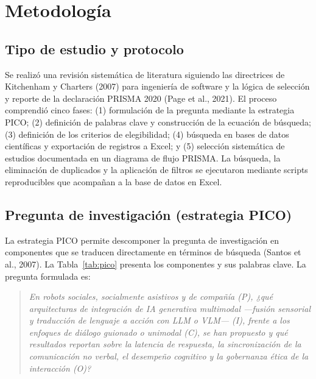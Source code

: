 \documentclass[runningheads]{llncs}
\begin{document}
\section{Metodología}
\subsection{Tipo de estudio y protocolo}
Se realizó una revisión sistemática de literatura siguiendo las directrices de Kitchenham y Charters (2007) para ingeniería de software y la lógica de selección y reporte de la declaración PRISMA 2020 (Page et al., 2021). El proceso comprendió cinco fases: (1) formulación de la pregunta mediante la estrategia PICO; (2) definición de palabras clave y construcción de la ecuación de búsqueda; (3) definición de los criterios de elegibilidad; (4) búsqueda en bases de datos científicas y exportación de registros a Excel; y (5) selección sistemática de estudios documentada en un diagrama de flujo PRISMA. La búsqueda, la eliminación de duplicados y la aplicación de filtros se ejecutaron mediante scripts reproducibles que acompañan a la base de datos en Excel.

\subsection{Pregunta de investigación (estrategia PICO)}
La estrategia PICO permite descomponer la pregunta de investigación en componentes que se traducen directamente en términos de búsqueda (Santos et al., 2007). La Tabla~\ref{tab:pico} presenta los componentes y sus palabras clave. La pregunta formulada es:

\begin{quote}
\textit{En robots sociales, socialmente asistivos y de compañía (P), ¿qué arquitecturas de integración de IA generativa multimodal ---fusión sensorial y traducción de lenguaje a acción con LLM o VLM--- (I), frente a los enfoques de diálogo guionado o unimodal (C), se han propuesto y qué resultados reportan sobre la latencia de respuesta, la sincronización de la comunicación no verbal, el desempeño cognitivo y la gobernanza ética de la interacción (O)?}
\end{quote}
\end{document}
